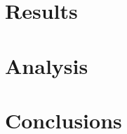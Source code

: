 \documentclass[11pt]{article}
\begin{document}
\section{Results}

\section{Analysis}


\section{Conclusions}



\end{document}
